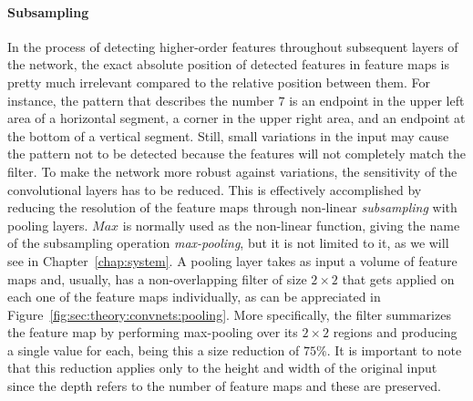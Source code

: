 \paragraph{Subsampling}
In the process of detecting higher-order features throughout subsequent layers of the network, the exact absolute position of detected features in feature maps is pretty much irrelevant compared to the relative position between them.
For instance, the pattern that describes the number $7$ is an endpoint in the upper left area of a horizontal segment, a corner in the upper right area, and an endpoint at the bottom of a vertical segment.
Still, small variations in the input may cause the pattern not to be detected because the features will not completely match the filter.
To make the network more robust against variations, the sensitivity of the convolutional layers has to be reduced.
This is effectively accomplished by reducing the resolution of the feature maps through non-linear \emph{subsampling} with pooling layers.
$Max$ is normally used as the non-linear function, giving the name of the subsampling operation \emph{max-pooling}, but it is not limited to it, as we will see in Chapter~\ref{chap:system}.
A pooling layer takes as input a volume of feature maps and, usually, has a non-overlapping filter of size ${2}\times{2}$ that gets applied on each one of the feature maps individually, as can be appreciated in Figure~\ref{fig:sec:theory:convnets:pooling}.
More specifically, the filter summarizes the feature map by performing max-pooling over its ${2}\times{2}$ regions and producing a single value for each, being this a size reduction of $75\%$.
It is important to note that this reduction applies only to the height and width of the original input since the depth refers to the number of feature maps and these are preserved.

